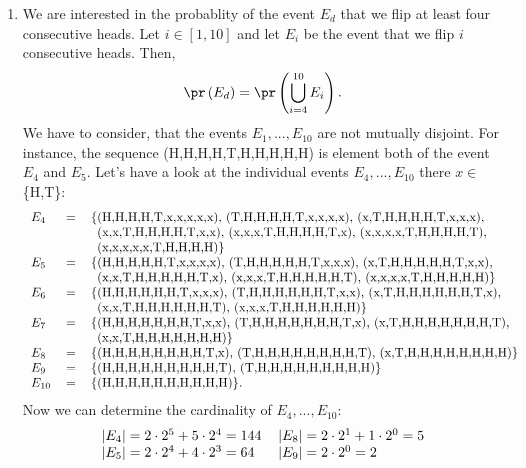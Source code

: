 \begin{enumerate}
  \item[(d)] We are interested in the probablity of the event $E_d$ that we flip
    at least four consecutive heads. Let $i \in [1,10]$ and let $E_i$ be the event
    that we flip $i$ consecutive heads. Then,
    \[ \pr\left(E_d\right) = \pr\left(\bigcup_{i=4}^{10} E_i\right).\]
    We have to consider, that the events $E_1,..., E_{10}$ are not mutually disjoint.
    For instance, the sequence (H,H,H,H,T,H,H,H,H,H) is element both of the event
    $E_4$ and $E_5$. Let's have a look at the individual events $E_4,..., E_{10}$
    there $x \in$ \{H,T\}:
    \begin{align*}
      \begin{tabular}{lll}
        $E_4$ &=  &\{(H,H,H,H,T,x,x,x,x,x), (T,H,H,H,H,T,x,x,x,x), (x,T,H,H,H,H,T,x,x,x), \\
              &   &\ \,(x,x,T,H,H,H,H,T,x,x), (x,x,x,T,H,H,H,H,T,x), (x,x,x,x,T,H,H,H,H,T), \\
              &   &\ \,(x,x,x,x,x,T,H,H,H,H)\} \\
        $E_5$ &= &\{(H,H,H,H,H,T,x,x,x,x), (T,H,H,H,H,H,T,x,x,x), (x,T,H,H,H,H,H,T,x,x), \\
              &   &\ \,(x,x,T,H,H,H,H,H,T,x), (x,x,x,T,H,H,H,H,H,T), (x,x,x,x,T,H,H,H,H,H)\} \\
        $E_6$ &=  &\{(H,H,H,H,H,H,T,x,x,x), (T,H,H,H,H,H,H,T,x,x), (x,T,H,H,H,H,H,H,T,x), \\
              &   &\ \,(x,x,T,H,H,H,H,H,H,T), (x,x,x,T,H,H,H,H,H,H)\} \\
        $E_7$ &=  &\{(H,H,H,H,H,H,H,T,x,x), (T,H,H,H,H,H,H,H,T,x), (x,T,H,H,H,H,H,H,H,T), \\
              &   &\ \,(x,x,T,H,H,H,H,H,H,H)\} \\
        $E_8$ &=  &\{(H,H,H,H,H,H,H,H,T,x), (T,H,H,H,H,H,H,H,H,T), (x,T,H,H,H,H,H,H,H,H)\} \\
        $E_9$ &=  &\{(H,H,H,H,H,H,H,H,H,T), (T,H,H,H,H,H,H,H,H,H)\} \\
        $E_{10}$ &=  &\{(H,H,H,H,H,H,H,H,H,H)\}.
      \end{tabular}
    \end{align*}
    Now we can determine the cardinality of $E_4, ..., E_{10}$:
    \begin{align*}
      \begin{tabular}{ll}
        $|E_4| = 2 \cdot 2^5 + 5 \cdot 2^4 = 144$   &$|E_8| = 2 \cdot 2^1 + 1 \cdot 2^0 = 5$ \\
        $|E_5| = 2 \cdot 2^4 + 4 \cdot 2^3 = 64$    &$|E_9| = 2 \cdot 2^0 = 2$ \\

\end{tabular}
\end{align*}
\end{enumerate}
